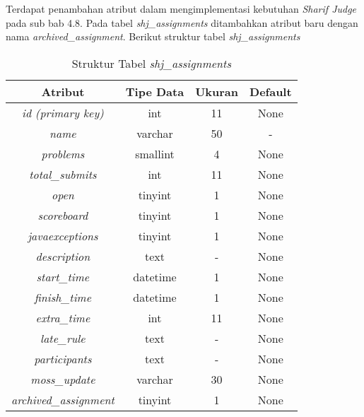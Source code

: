 \begin{enumerate}
	Terdapat penambahan atribut dalam mengimplementasi kebutuhan \textit{Sharif Judge} pada sub bab 4.8. Pada tabel \textit{shj\_assignments} ditambahkan atribut baru dengan nama \textit{archived\_assignment}. Berikut struktur tabel \textit{shj\_assignments}
	
	\begin{table}[H] %
		\centering 
		\caption{Struktur Tabel \textit{shj\_assignments}}
		\label{tab:atributtabelassignments}
		\begin{tabular}{|c|c|c|c|}
			\hline
			\textbf{Atribut} & \textbf{Tipe Data} & \textbf{Ukuran}  & \textbf{Default} \\
			\hline
			\textit{id (primary key)} & int & 11  & None \\
			\hline
			\textit{name} & varchar & 50  & - \\
			\hline
			\textit{problems} & smallint & 4  & None \\
			\hline
			\textit{total\_submits} & int & 11  & None \\
			\hline
			\textit{open} & tinyint & 1  & None \\
			\hline
			\textit{scoreboard} & tinyint & 1  & None \\
			\hline
			\textit{javaexceptions} & tinyint & 1  & None \\
			\hline
			\textit{description} & text & -  & None \\
			\hline
			\textit{start\_time} & datetime & 1  & None \\
			\hline
			\textit{finish\_time} & datetime & 1  & None \\
			\hline
			\textit{extra\_time} & int & 11  & None \\
			\hline
			\textit{late\_rule} & text & -  & None \\
			\hline
			\textit{participants} & text & -  & None \\
			\hline
			\textit{moss\_update} & varchar & 30  & None \\
			\hline
			\textit{archived\_assignment} & tinyint & 1  & None \\
			\hline
		\end{tabular}%
	\end{table}


\end{enumerate}

